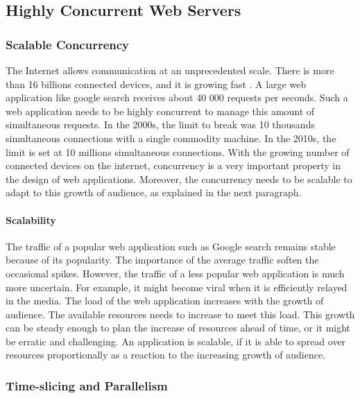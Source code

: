 \subsection{Highly Concurrent Web Servers}

\subsubsection{Scalable Concurrency}

The Internet allows communication at an unprecedented scale.
There is more than 16 billions connected devices, and it is growing fast \cite{Hilbert2011}.
A large web application like google search receives about 40 000 requests per seconds.
Such a web application needs to be highly concurrent to manage this amount of simultaneous requests.
In the 2000s, the limit to break was 10 thousands simultaneous connections with a single commodity machine.
In the 2010s, the limit is set at 10 millions simultaneous connections.
With the growing number of connected devices on the internet, concurrency is a very important property in the design of web applications.
Moreover, the concurrency needs to be scalable to adapt to this growth of audience, as explained in the next paragraph.

\paragraph{Scalability}

The traffic of a popular web application such as Google search remains stable because of its popularity.
The importance of the average traffic soften the occasional spikes.
However, the traffic of a less popular web application is much more uncertain.
For example, it might become viral when it is efficiently relayed in the media.
The load of the web application increases with the growth of audience.
The available resources needs to increase to meet this load.
This growth can be steady enough to plan the increase of resources ahead of time, or it might be erratic and challenging.
An application is scalable, if it is able to spread over resources proportionally as a reaction to the increasing growth of audience.

\subsubsection{Time-slicing and Parallelism}

